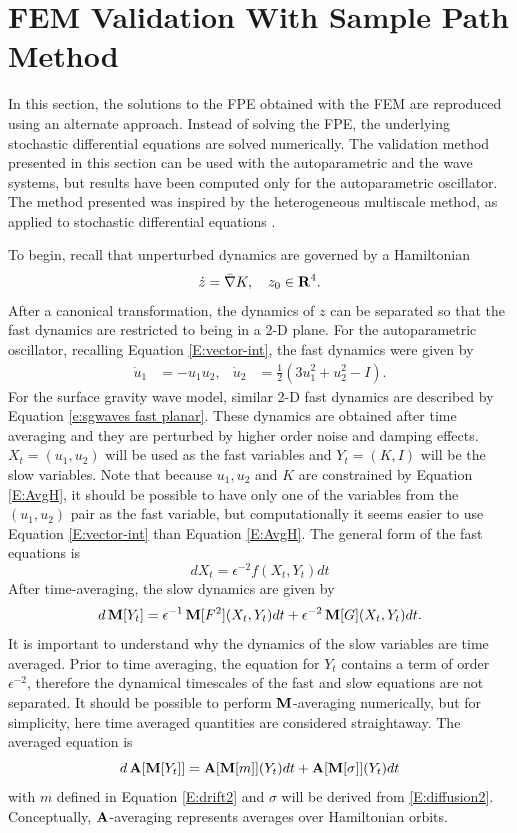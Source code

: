 \section{FEM Validation With Sample Path Method}

In this section, the solutions to the FPE obtained with the FEM are reproduced using an alternate approach. Instead of solving the FPE, the underlying stochastic differential equations are solved numerically. The validation method presented in this section can be used with the autoparametric and the wave systems, but results have been computed only for the autoparametric oscillator. The method presented was inspired by the heterogeneous multiscale method, as applied to stochastic differential equations \citep{e05:_analy}.

To begin, recall that unperturbed dynamics are governed by a Hamiltonian
\[
\dot z = \bar \nabla K, \quad z_0 \in \mathbf R^4.
\]
After a canonical transformation, the dynamics of $z$ can be separated so that the fast dynamics are restricted to being in a 2-D plane. For the autoparametric oscillator, recalling Equation \eqref{E:vector-int}, the fast dynamics were given by
\begin{align*}
\dot u_1 &= - u_1 u_2, & \dot u_2 &= \frac12 (3 u_1^2 + u_2^2 - I).
\end{align*}
For the surface gravity wave model, similar 2-D fast dynamics are described by Equation \eqref{e:sgwaves fast planar}. These dynamics are obtained after time averaging and they are perturbed by higher order noise and damping effects. $X_t = (u_1,u_2)$ will be used as the fast variables and $Y_t = (K,I)$ will be the slow variables. Note that because $u_1, u_2$ and $K$ are constrained by Equation \eqref{E:AvgH}, it should be possible to have only one of the variables from the $(u_1,u_2)$ pair as the fast variable, but computationally it seems easier to use Equation \eqref{E:vector-int} than Equation \eqref{E:AvgH}. The general form of the fast equations is
\[
d X_t = \epsilon^{-2} f(X_t,Y_t) dt
\]
After time-averaging, the slow dynamics are given by
\begin{equation}
d \operatorname{\mathbf M}[Y_t] = \epsilon^{-1} \operatorname{\mathbf M}[F^2](X_t,Y_t) dt + \epsilon^{-2} \operatorname{\mathbf M}[G](X_t,Y_t) dt.
\end{equation}
It is important to understand why the dynamics of the slow variables are time averaged. Prior to time averaging, the equation for $Y_t$ contains a term of order $\epsilon^{-2}$, therefore the dynamical timescales of the fast and slow equations are not separated. It should be possible to perform $\operatorname{\mathbf M}$-averaging numerically, but for simplicity, here time averaged quantities are considered straightaway.
The averaged equation is
\begin{equation}
\label{e:averaged}
d\operatorname{\mathbf A}[\operatorname{\mathbf M}[Y_t]] = \operatorname{\mathbf A}[\operatorname{\mathbf M}[m]](Y_t) dt + \operatorname{\mathbf A}[\operatorname{\mathbf M}[\sigma]](Y_t) dt
\end{equation}
with $m$ defined in Equation \eqref{E:drift2} and $\sigma$ will be derived from \eqref{E:diffusion2}. Conceptually, $\operatorname{\mathbf A}$-averaging represents averages over Hamiltonian orbits.

